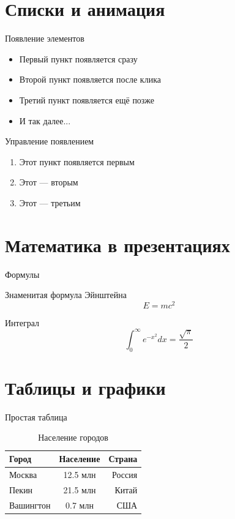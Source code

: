 \documentclass[14pt]{beamer}
\begin{document}
\section{Списки и анимация}

\begin{frame}{Появление элементов}
  \begin{itemize}
    \item Первый пункт появляется сразу
    \pause
    \item Второй пункт появляется после клика
    \pause
    \item Третий пункт появляется ещё позже
    \pause
    \item И так далее...
  \end{itemize}
\end{frame}

\begin{frame}{Управление появлением}
  \begin{enumerate}[<+->]
    \item Этот пункт появляется первым
    \item Этот — вторым
    \item Этот — третьим
  \end{enumerate}
\end{frame}

\section{Математика в презентациях}

\begin{frame}{Формулы}
  \begin{block}{Знаменитая формула Эйнштейна}
    \[
      E = mc^2
    \]
  \end{block}
  
  \begin{block}{Интеграл}
    \[
      \int_{0}^{\infty} e^{-x^2} dx = \frac{\sqrt{\pi}}{2}
    \]
  \end{block}
\end{frame}

\section{Таблицы и графики}

\begin{frame}{Простая таблица}
  \begin{table}
    \centering
    \begin{tabular}{|l|c|r|}
      \hline
      \textbf{Город} & \textbf{Население} & \textbf{Страна} \\
      \hline
      Москва & 12.5 млн & Россия \\
      Пекин & 21.5 млн & Китай \\
      Вашингтон & 0.7 млн & США \\
      \hline
    \end{tabular}
    \caption{Население городов}
  \end{table}
\end{frame}
\end{document}
